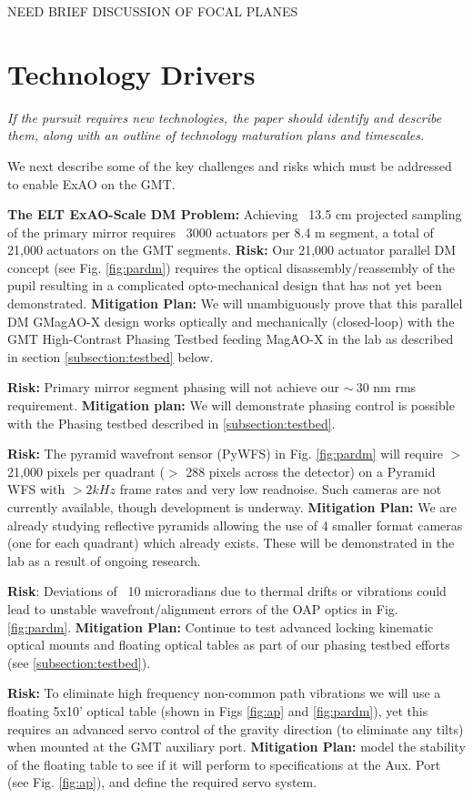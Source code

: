 \documentclass[12pt,preprint]{aastex}
\begin{document}
NEED BRIEF DISCUSSION OF FOCAL PLANES

\section{Technology Drivers} 
\textit{If the pursuit requires new technologies, the paper should identify and
describe them, along with an outline of technology maturation plans and timescales.}

We next describe some of the key challenges and risks which must be addressed to enable ExAO on the GMT.

\textbf{The ELT ExAO-Scale DM Problem:} Achieving ~13.5 cm projected sampling of the primary mirror requires ~3000 actuators per 8.4 m segment, a total of 21,000 actuators on the GMT segments. \textbf{Risk:} Our 21,000 actuator parallel DM concept (see Fig. \ref{fig:pardm}) requires the optical disassembly/reassembly of the pupil resulting in a complicated opto-mechanical design that has not yet been demonstrated. \textbf{Mitigation Plan:} We will unambiguously prove that this parallel DM GMagAO-X design works optically and mechanically (closed-loop) with the GMT High-Contrast Phasing Testbed feeding MagAO-X in the lab as described in section \ref{subsection:testbed} below. 

\textbf{Risk:} Primary mirror segment phasing will not achieve our $\sim~30$ nm rms requirement. \textbf{Mitigation plan:} We will demonstrate phasing control is possible with the Phasing testbed described in \ref{subsection:testbed}. 

\textbf{Risk:} The pyramid wavefront sensor (PyWFS) in Fig. \ref{fig:pardm} will require $>$ 21,000 pixels per quadrant ($>$ 288 pixels across the detector) on a Pyramid WFS with $>2kHz$ frame rates and very low readnoise.  Such cameras are not currently available, though development is underway. \textbf{Mitigation Plan:}  We are already studying reflective pyramids allowing the use of 4 smaller format cameras (one for each quadrant) which already exists. These will be demonstrated in the lab as a result of ongoing research.

\textbf{Risk}: Deviations of ~10 microradians due to thermal drifts or vibrations could lead to unstable wavefront/alignment errors of the OAP optics in Fig. \ref{fig:pardm}. \textbf{Mitigation Plan:} Continue to test advanced locking kinematic optical mounts and floating optical tables as part of our phasing testbed efforts (see \ref{subsection:testbed}).

\textbf{Risk:} To eliminate high frequency non-common path vibrations we will use a floating 5x10' optical table (shown in Figs \ref{fig:ap} and \ref{fig:pardm}), yet this requires an advanced servo control of the gravity direction (to eliminate any tilts) when mounted at the GMT auxiliary port. \textbf{Mitigation Plan:} model the stability of the floating table to see if it will perform to specifications at the Aux. Port (see Fig. \ref{fig:ap}), and define the required servo system.
\end{document}
